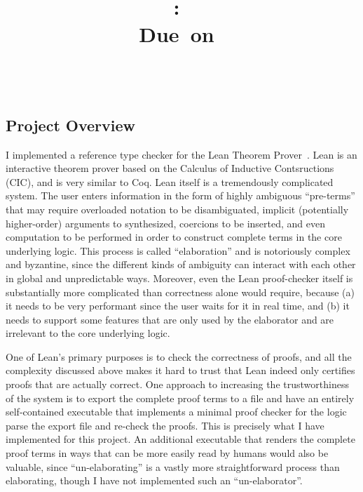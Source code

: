 \documentclass{article}
\title{\vspace{2in}\textmd{\textbf{\hmwkClass:\ \hmwkTitle}}\\\normalsize\vspace{0.1in}\small{Due\ on\ \hmwkDueDate}\\\vspace{0.1in}\large{\textit{\hmwkClassInstructor\ \hmwkClassTime}}\vspace{3in}}
\date{}
\author{\textbf{\hmwkAuthorName}}
\begin{document}
\begin{spacing}{1.1}
\maketitle
\newpage


\clearpage
\section{Project Overview}

I implemented a reference type checker for the Lean Theorem Prover~\cite{de2015lean}. Lean is an interactive theorem prover based on the Calculus of Inductive Contsructions (CIC), and is very similar to Coq. Lean itself is a tremendously complicated system. The user enters information in the form of highly ambiguous ``pre-terms'' that may require overloaded notation to be disambiguated, implicit (potentially higher-order) arguments to synthesized, coercions to be inserted, and even computation to be performed in order to construct complete terms in the core underlying logic. This process is called ``elaboration'' and is notoriously complex and byzantine, since the different kinds of ambiguity can interact with each other in global and unpredictable ways. Moreover, even the Lean proof-checker itself is substantially more complicated than correctness alone would require, because (a) it needs to be very performant since the user waits for it in real time, and (b) it needs to support some features that are only used by the elaborator and are irrelevant to the core underlying logic.

One of Lean's primary purposes is to check the correctness of proofs, and all the complexity discussed above makes it hard to trust that Lean indeed only certifies proofs that are actually correct. One approach to increasing the trustworthiness of the system is to export the complete proof terms to a file and have an entirely self-contained executable that implements a minimal proof checker for the logic parse the export file and re-check the proofs. This is precisely what I have implemented for this project. An additional executable that renders the complete proof terms in ways that can be more easily read by humans would also be valuable, since ``un-elaborating'' is a vastly more straightforward process than elaborating, though I have not implemented such an ``un-elaborator''.


\end{spacing}
\end{document}
